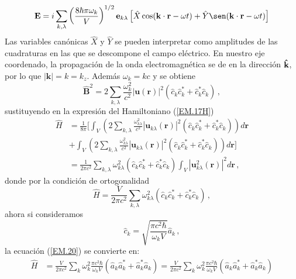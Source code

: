 \begin{equation*}
  \mathbf{E} = i \sum_{k,\lambda} \left( \frac{8\hbar \pi \omega_k}{V} \right)^{1/2} \mathbf{e}_{k\lambda} \left[ \hat{X}\cos(\mathbf{k}\cdot\mathbf{r} - \omega t) + \hat{Y}\sen(\mathbf{k}\cdot\mathbf{r} - \omega t) \right]
\end{equation*}
Las variables canónicas $\hat{X}$ y $\hat{Y}$ se pueden interpretar como amplitudes de las cuadraturas en las que se descompone el campo eléctrico. \cite{Mandel}
En nuestro eje coordenado, la propagación de la onda electromagnética se de en la dirección $\mathbf{\hat{\textnormal{\bfseries k}}}$, por lo que $|\mathbf{k}| = k = k_z$. Además $\omega_k = kc$ y se obtiene
\begin{equation}
  \label{EM.19}
  \hat{\mathbf{B}}^2 = 2 \sum_{k,\lambda} \frac{\omega_k^2}{c^2}  |\mathbf{u}(\mathbf{r})|^2 \left( \hat{c}_{k} \hat{c}_{k}^* + \hat{c}_{k}^* \hat{c}_{k} \right) \,,
\end{equation}
sustituyendo en la expresión del Hamiltoniano (\ref{EM.17H})
\begin{align*}
  \hat{H} & = \frac{1}{8\pi} \Bigg[ \int_V \left( 2\sum_{k,\lambda} \frac{\omega_{k\lambda}^2}{c^2}  |\mathbf{u}_{k\lambda}(\mathbf{r})|^2 \left( \hat{c}_{k} \hat{c}_{k}^* + \hat{c}_{k}^* \hat{c}_{k} \right) \right) d\mathbf{r} \\ &+ \int_V \left( 2 \sum_{k,\lambda} \frac{\omega_{k\lambda}^2}{c^2} |\mathbf{u}_{k\lambda}(\mathbf{r})|^2 \left( \hat{c}_{k} \hat{c}_{k}^* + \hat{c}_{k}^* \hat{c}_{k} \right) \right)d\mathbf{r} \Bigg] \\
          & = \frac{1}{2\pi c^2} \sum_{k,\lambda} \omega_{k\lambda}^2 \left( \hat{c}_{k} \hat{c}_{k}^* + \hat{c}_{k}^* \hat{c}_{k} \right) \int_V |\mathbf{u}_{k\lambda}^2(\mathbf{r})|^2 d\mathbf{r} \,,
\end{align*}
donde por la condición de ortogonalidad
\begin{equation}
  \label{EM.20}
  \hat{H} = \frac{V}{2\pi c^2}\sum_{k,\lambda} \omega_{k\lambda}^2 \left( \hat{c}_{k} \hat{c}_{k}^* + \hat{c}_{k}^* \hat{c}_{k} \right) \,,
\end{equation}
ahora si consideramos
\begin{equation}
  \label{EM.21}
  \hat{c}_{k} = \sqrt{\frac{\pi c^{2}\hbar}{\omega_{k}V}} \hat{a}_{k}\,,
\end{equation}
la ecuaci\'on (\ref{EM.20}) se convierte en:
\begin{align*}
  \hat{H} & = \frac{V}{2\pi c^2}\sum_{k} \omega_{k}^2 \frac{\pi c^{2}\hbar}{\omega_{k}V}\left(\hat{a}_{k}\hat{a}^{*}_{k} + \hat{a}_{k}^{*} \hat{a}_{k} \right) = \frac{V}{2\pi c^2}\sum_{k} \omega_{k}^2 \frac{\pi c^{2}\hbar}{\omega_{k}V}\left(\hat{a}_{k}\hat{a}^{*}_{k} + \hat{a}_{k}^{*} \hat{a}_{k} \right) \\
\end{align*}
